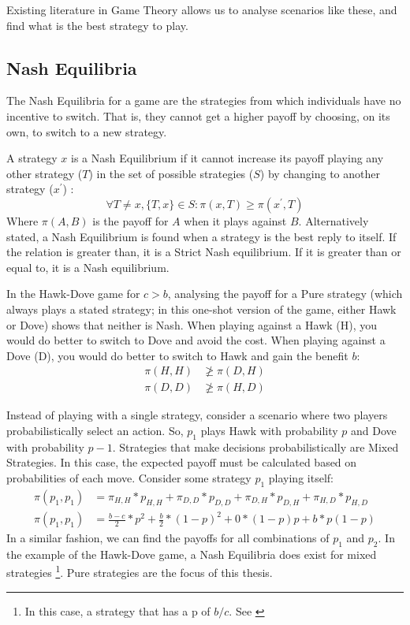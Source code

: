 \documentclass[a4paper,11pt,bcshonoursthesis,singlespace,oneside,thesisdraft,pdflatex]{cssethesis}
\renewcommand{\cite}{\citep} %
\begin{document}
Existing literature in Game Theory allows us to analyse scenarios like these, and find what is the best strategy to play.
\subsection{Nash Equilibria}
The Nash Equilibria for a game are the strategies from which individuals have no incentive to switch. 
That is, they cannot get a higher payoff by choosing, on its own, to switch to a new strategy.  

A strategy $x$ is a Nash Equilibrium if it cannot increase its payoff playing any other strategy ($T$) in the set of possible strategies ($S$) by changing to another strategy ($x^\prime$) \citep[][ch. 1]{robert1992primer}:
\begin{equation}
\forall T \neq x, \{T,x\} \in S: \pi(x,T)\geq \pi(x^\prime,T)
\end{equation}
Where $\pi(A,B)$ is the payoff for $A$ when it plays against $B$. 
Alternatively stated, a Nash Equilibrium is found when a strategy is the best reply to itself. 
If the relation is greater than, it is a Strict Nash equilibrium. 
If it is greater than or equal to, it is a Nash equilibrium.

In the Hawk-Dove game for $c>b$, analysing the payoff for a Pure strategy (which always plays a stated strategy; in this one-shot version of the game, either Hawk or Dove) shows that neither is Nash. 
When playing against a Hawk (H), you would do better to switch to Dove and avoid the cost. 
When playing against a Dove (D), you would do better to switch to Hawk and gain the benefit $b$:
\begin{align*}
\pi(H,H)&\ngeq \pi(D,H)\\
\pi(D,D)&\ngeq \pi(H,D)
\end{align*}

Instead of playing with a single strategy, consider a scenario where two players probabilistically select an action. So, $p_1$ plays Hawk with probability $p$ and Dove with probability $p-1$. Strategies that make decisions probabilistically are Mixed Strategies. 
In this case, the expected payoff must be calculated based on probabilities of each move. 
Consider some strategy $p_1$ playing itself: 
\begin{align}
\label{eqn:probabilities}
\pi(p_1,p_1)&=\pi_{H,H}*p_{H,H}+\pi_{D,D}*p_{D,D}+\pi_{D,H}*p_{D,H}+\pi_{H,D}*p_{H,D}\\
\pi(p_1,p_1)&=\frac{b-c}{2}*p^2+\frac{b}{2}*(1-p)^2+0*(1-p)p+b*p(1-p) \nonumber
\end{align}
In a similar fashion, we can find the payoffs for all combinations of $p_1$ and $p_2$. 
In the example of the Hawk-Dove game, a Nash Equilibria does exist for mixed strategies \footnote{In this case, a strategy that has a p of $b/c$. See \cite{nowak2006evolutionary63}}. Pure strategies are the focus of this thesis.
\end{document}
